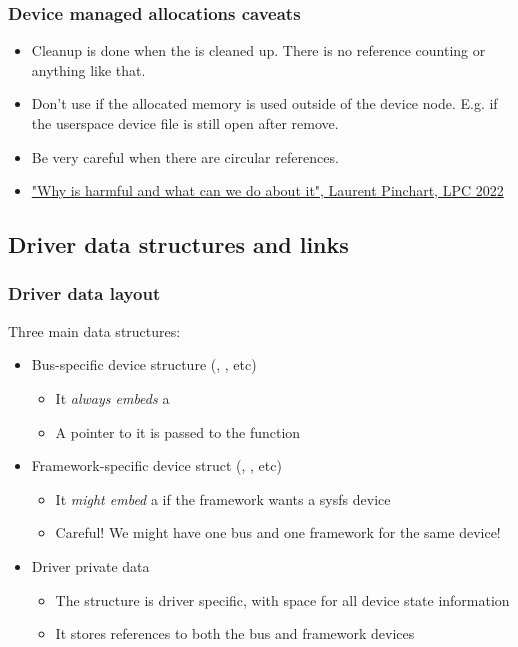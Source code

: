 \begin{frame}
  \frametitle{Device managed allocations caveats}
  \begin{itemize}
  \item Cleanup is done when the  is cleaned up.
    There is no reference counting or anything like that.
  \item Don't use if the allocated memory is used outside of the device
    node. E.g. if the userspace device file is still open after remove.
  \item Be very careful when there are circular references.
  \item \href{https://lpc.events/event/16/contributions/1227/}{"Why is
     harmful and what can we do about it",
    Laurent Pinchart, LPC 2022}
  \end{itemize}
\end{frame}


\subsection{Driver data structures and links}

\begin{frame}
  \frametitle{Driver data layout}
  Three main data structures:
  \begin{itemize}

  \item Bus-specific device structure (,
    , etc)
  \begin{itemize}
  \item It \emph{always embeds} a 
  \item A pointer to it is passed to the  function
  \end{itemize}

  \item Framework-specific device struct (,
    , etc)
  \begin{itemize}
  \item It \emph{might embed} a  if the framework wants
    a sysfs device
  \item Careful! We might have one bus  and one
    framework  for the same device!
  \end{itemize}

  \item Driver private data
  \begin{itemize}
  \item The structure is driver specific, with space for all device
    state information
  \item It stores references to both the bus and framework devices
  \end{itemize}

  \end{itemize}
\end{frame}

